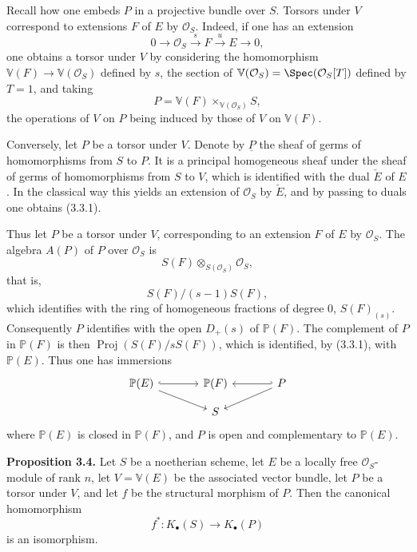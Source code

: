 Recall how one embeds $P$ in a projective bundle over $S$. Torsors under $V$ correspond to extensions $F$ of $E$ by $\mathcal O_S$. Indeed, if one has an extension
\[
0\longrightarrow\mathcal O_S\xrightarrow{s}F\xrightarrow{u}E\longrightarrow 0,
\tag{3.3.1}
\]
one obtains a torsor under $V$ by considering the homomorphism $\mathbb V(F)\to\mathbb V(\mathcal O_S)$ defined by $s$, the section of $\mathbb V(\mathcal O_S)=\Spec(\mathcal O_S[T])$ defined by $T=1$, and taking
\[
 P=\mathbb V(F)\times_{\mathbb V(\mathcal O_S)}S,
\]
the operations of $V$ on $P$ being induced by those of $V$ on $\mathbb V(F)$.

Conversely, let $P$ be a torsor under $V$. Denote by $\underline P$ the sheaf of germs of homomorphisms from $S$ to $P$. It is a principal homogeneous sheaf under the sheaf of germs of homomorphisms from $S$ to $V$, which is identified with the dual $\check E$ of $E$. In the classical way this yields an extension of $\mathcal O_S$ by $\check E$, and by passing to duals one obtains (3.3.1).

Thus let $P$ be a torsor under $V$, corresponding to an extension $F$ of $E$ by $\mathcal O_S$. The algebra $A(P)$ of $P$ over $\mathcal O_S$ is
\[
 S(F)\otimes_{S(\mathcal O_S)}\mathcal O_S,
\]
that is,
\[
 S(F)/(s-1)S(F),
\]
which identifies with the ring of homogeneous fractions of degree $0$, $S(F)_{(s)}$. Consequently $P$ identifies with the open $D_+(s)$ of $\mathbb P(F)$. The complement of $P$ in $\mathbb P(F)$ is then $\operatorname{Proj}(S(F)/sS(F))$, which is identified, by (3.3.1), with $\mathbb P(E)$. Thus one has immersions
\[
\begin{tikzcd}[column sep=large,row sep=small]
\mathbb P(E) \arrow[r,hook] \arrow[dr] & \mathbb P(F) & P \arrow[l,hook'] \arrow[dl]\\
& S &
\end{tikzcd}
\]
where $\mathbb P(E)$ is closed in $\mathbb P(F)$, and $P$ is open and complementary to $\mathbb P(E)$.

\textbf{Proposition 3.4.} Let $S$ be a noetherian scheme, let $E$ be a locally free $\mathcal O_S$-module of rank $n$, let $V=\mathbb V(E)$ be the associated vector bundle, let $P$ be a torsor under $V$, and let $f$ be the structural morphism of $P$. Then the canonical homomorphism
\[
 f^*:K_\bullet(S)\longrightarrow K_\bullet(P)
\]
is an isomorphism.

